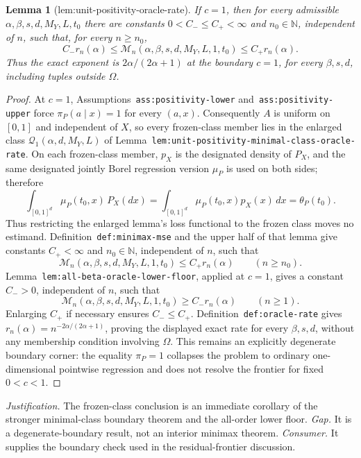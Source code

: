 \documentclass{article}
\newtheorem{lemma}{Lemma}
\begin{document}
\begin{lemma}[lem:unit-positivity-oracle-rate]\label{lem:unit-positivity-oracle-rate}
If \(c=1\), then for every admissible \(\alpha,\beta,s,d,M_Y,L,t_0\) there are constants \(0<C_-\le C_+<\infty\) and \(n_0\in\mathbb N\), independent of \(n\), such that, for every \(n\ge n_0\),
\[
C_-r_n(\alpha)
\le
\mathcal M_n(\alpha,\beta,s,d,M_Y,L,1,t_0)
\le
C_+r_n(\alpha).
\]
Thus the exact exponent is \(2\alpha/(2\alpha+1)\) at the boundary \(c=1\), for every \(\beta,s,d\), including tuples outside \(\Omega\).
\end{lemma}
\begin{proof}
At \(c=1\), Assumptions~\texttt{ass:positivity-lower} and~\texttt{ass:positivity-upper} force \(\pi_P(a\mid x)=1\) for every \((a,x)\). Consequently \(A\) is uniform on \([0,1]\) and independent of \(X\), so every frozen-class member lies in the enlarged class \(\mathcal Q_1(\alpha,d,M_Y,L)\) of Lemma~\texttt{lem:unit-positivity-minimal-class-oracle-rate}. On each frozen-class member, \(p_X\) is the designated density of \(P_X\), and the same designated jointly Borel regression version \(\mu_P\) is used on both sides; therefore
\[
\int_{[0,1]^d}\mu_P(t_0,x)\,P_X(dx)
=
\int_{[0,1]^d}\mu_P(t_0,x)p_X(x)\,dx
=
\theta_P(t_0).
\]
Thus restricting the enlarged lemma's loss functional to the frozen class moves no estimand. Definition~\texttt{def:minimax-mse} and the upper half of that lemma give constants \(C_+<\infty\) and \(n_0\in\mathbb N\), independent of \(n\), such that
\[
\mathcal M_n(\alpha,\beta,s,d,M_Y,L,1,t_0)
\le C_+r_n(\alpha)
\qquad(n\ge n_0).
\]
Lemma~\texttt{lem:all-beta-oracle-lower-floor}, applied at \(c=1\), gives a constant \(C_->0\), independent of \(n\), such that
\[
\mathcal M_n(\alpha,\beta,s,d,M_Y,L,1,t_0)
\ge C_-r_n(\alpha)
\qquad(n\ge1).
\]
Enlarging \(C_+\) if necessary ensures \(C_-\le C_+\). Definition~\texttt{def:oracle-rate} gives \(r_n(\alpha)=n^{-2\alpha/(2\alpha+1)}\), proving the displayed exact rate for every \(\beta,s,d\), without any membership condition involving \(\Omega\). This remains an explicitly degenerate boundary corner: the equality \(\pi_P=1\) collapses the problem to ordinary one-dimensional pointwise regression and does not resolve the frontier for fixed \(0<c<1\).
\end{proof}
\par\smallskip\noindent \textit{Justification.} The frozen-class conclusion is an immediate corollary of the stronger minimal-class boundary theorem and the all-order lower floor. \textit{Gap.} It is a degenerate-boundary result, not an interior minimax theorem. \textit{Consumer.} It supplies the boundary check used in the residual-frontier discussion.
\end{document}
